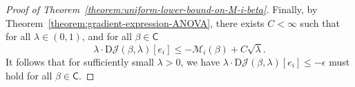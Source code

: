 \documentclass[10pt,a4paper]{amsart}
\newcommand{\eps}{\epsilon}
\begin{document}
\begin{proof}[Proof of Theorem~\ref{theorem:uniform-lower-bound-on-M-i-beta}]
Finally, by Theorem~\ref{theorem:gradient-expression-ANOVA}, there exists $C < \infty$ such that for all $\lambda \in (0, 1)$,
and for all $\beta \in \mathsf{C}$
\begin{equation*}
	\lambda \cdot \mathrm{D}\mathcal{J}(\beta, \lambda)[e_i] \le -\mathcal{M}_i(\beta) + C \sqrt{\lambda}.
\end{equation*}
It follows that for sufficiently small \( \lambda > 0 \), we have
$\lambda \cdot \mathrm{D}\mathcal{J}(\beta, \lambda)[e_i] \le -\eps$ must hold for all $\beta \in \mathsf{C}$.
\end{proof} 
\end{document}
